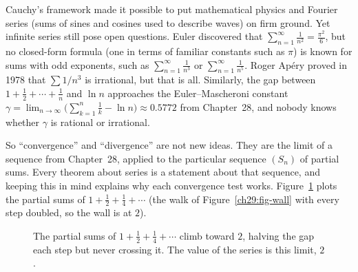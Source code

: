 \begin{historybox}
Cauchy's framework made it possible to put mathematical physics and Fourier series (sums of sines and cosines used to describe waves) on firm ground. Yet infinite series still pose open questions. Euler discovered that $\sum_{n=1}^\infty \frac{1}{n^2} = \frac{\pi^2}{6}$, but no closed-form formula (one in terms of familiar constants such as $\pi$) is known for sums with odd exponents, such as $\sum_{n=1}^\infty \frac{1}{n^3}$ or $\sum_{n=1}^\infty \frac{1}{n^5}$. Roger Ap\'ery proved in 1978 that $\sum 1/n^3$ is irrational, but that is all. Similarly, the gap between $1 + \frac12 + \cdots + \frac1n$ and $\ln n$ approaches the Euler--Mascheroni constant $\gamma = \lim_{n\to\infty} \big(\sum_{k=1}^n \frac{1}{k} - \ln n\big) \approx 0.5772$ from Chapter~28, and nobody knows whether $\gamma$ is rational or irrational.
\end{historybox}

So ``convergence'' and ``divergence'' are not new ideas. They are the limit of a sequence from Chapter~28, applied to the particular sequence $(S_n)$ of partial sums. Every theorem about series is a statement about that sequence, and keeping this in mind explains why each convergence test works. Figure~\ref{ch29:fig-partialsums} plots the partial sums of $1 + \tfrac12 + \tfrac14 + \cdots$ (the walk of Figure~\ref{ch29:fig-wall} with every step doubled, so the wall is at $2$).

\begin{figure}[H]
\centering
{}
\caption{The partial sums of $1 + \tfrac12 + \tfrac14 + \cdots$ climb toward $2$, halving the gap each step but never crossing it. The value of the series is this limit, $2$.}
\label{ch29:fig-partialsums}
\end{figure}

